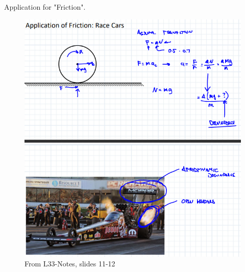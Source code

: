     
    \subsubsection{}
     Application for "Friction".
    
    \begin{figure}[h!]
    \centering 
    \includegraphics{WorkEnergyFigs/AppRaceCars.png}
    \caption{From L33-Notes, slides 11-12}
    \label{fig:AppRaceCars}
    \end{figure}